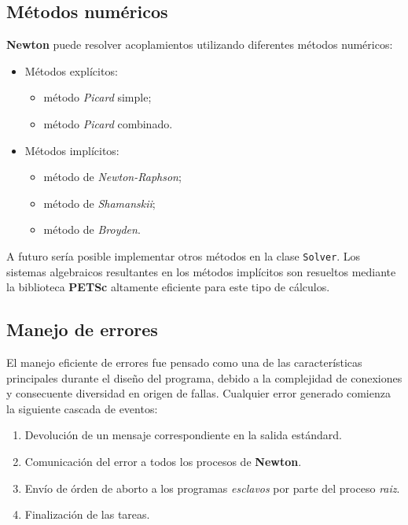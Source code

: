 \subsection*{Métodos numéricos}
\label{ap2:num-met}

\textbf{Newton} puede resolver acoplamientos utilizando diferentes métodos numéricos:
\begin{itemize}
\item Métodos explícitos:
\begin{itemize}
\item método \textit{Picard} simple;
\item método \textit{Picard} combinado.
\end{itemize}
\item Métodos implícitos:
\begin{itemize}
\item método de \textit{Newton-Raphson};
\item método de \textit{Shamanskii};
\item método de \textit{Broyden}.
\end{itemize}
\end{itemize}
A futuro sería posible implementar otros métodos en la clase \texttt{Solver}.
Los sistemas algebraicos resultantes en los métodos implícitos son resueltos mediante la biblioteca \textbf{PETSc} \cite{petsc-web-page} altamente eficiente para este tipo de cálculos.

\subsection*{Manejo de errores}
\label{ap2:error}

El manejo eficiente de errores fue pensado como una de las características principales durante el diseño del programa,
debido a la complejidad de conexiones y consecuente diversidad en origen de fallas.
Cualquier error generado comienza la siguiente cascada de eventos:
\begin{enumerate}
\item Devolución de un mensaje correspondiente en la salida estándard.
\item Comunicación del error a todos los procesos de \textbf{Newton}.
\item Envío de órden de aborto a los programas \textit{esclavos} por parte del proceso \textit{raiz}.
\item Finalización de las tareas.
\end{enumerate}

